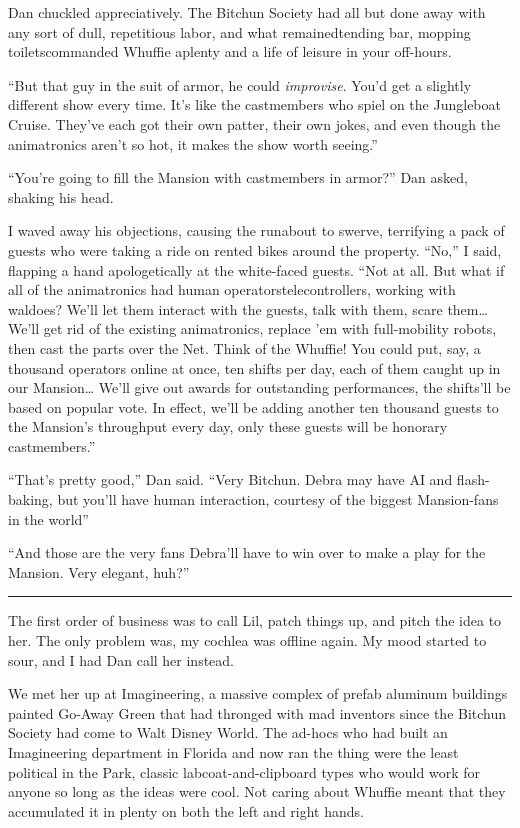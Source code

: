 Dan chuckled appreciatively. The Bitchun Society had all but done
away with any sort of dull, repetitious labor, and what
remained{\dash}tending bar, mopping toilets{\dash}commanded Whuffie aplenty and
a life of leisure in your off-hours.

“But that guy in the suit of armor, he could \emph{improvise}.
You'd get a slightly different show every time. It's like the
castmembers who spiel on the Jungleboat Cruise. They've each got
their own patter, their own jokes, and even though the animatronics
aren't so hot, it makes the show worth seeing.”

“You're going to fill the Mansion with castmembers in armor?” Dan
asked, shaking his head.

I waved away his objections, causing the runabout to swerve,
terrifying a pack of guests who were taking a ride on rented bikes
around the property. “No,” I said, flapping a hand apologetically
at the white-faced guests. “Not at all. But what if all of the
animatronics had human operators{\dash}te\-le\-con\-trol\-lers, working with
waldoes? We'll let them interact with the guests, talk with them,
scare them… We'll get rid of the existing animatronics, replace 'em
with full-mobility robots, then cast the parts over the Net. Think
of the Whuffie! You could put, say, a thousand operators online at
once, ten shifts per day, each of them caught up in our Mansion…
We'll give out awards for outstanding performances, the shifts'll
be based on popular vote. In effect, we'll be adding another ten
thousand guests to the Mansion's throughput every day, only these
guests will be honorary castmembers.”

“That's pretty good,” Dan said. “Very Bitchun. Debra may have AI
and flash-baking, but you'll have human interaction, courtesy of
the biggest Mansion-fans in the world{\dash}”

“And those are the very fans Debra'll have to win over to make a
play for the Mansion. Very elegant, huh?”

\begin{center}\rule{1in}{0.4pt}\end{center}

The first order of business was to call Lil, patch things up, and
pitch the idea to her. The only problem was, my cochlea was offline
again. My mood started to sour, and I had Dan call her instead.

We met her up at Imagineering, a massive complex of prefab aluminum
buildings painted Go-Away Green that had thronged with mad
inventors since the Bitchun Society had come to Walt Disney World.
The ad-hocs who had built an Imagineering department in Florida and
now ran the thing were the least political in the Park, classic
labcoat-and-clip\-board types who would work for anyone so long as
the ideas were cool. Not caring about Whuffie meant that they
accumulated it in plenty on both the left and right hands.

